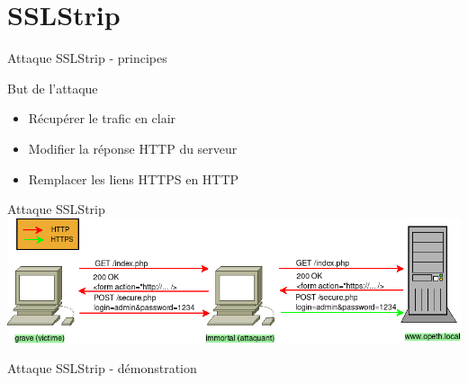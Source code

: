\section{SSLStrip}


\begin{frame}[fragile]{Attaque SSLStrip - principes}
  \begin{block}{But de l'attaque}
    \begin{itemize}
      \item Récupérer le trafic en clair
      \item Modifier la réponse HTTP du serveur
      \item Remplacer les liens HTTPS en HTTP
    \end{itemize}
  \end{block}
\end{frame}


\begin{frame}{Attaque SSLStrip}
    \includegraphics[width=\linewidth]{../medias/sslstrip/attack.png}
\end{frame}


\begin{frame}{Attaque SSLStrip - démonstration}
\end{frame}
